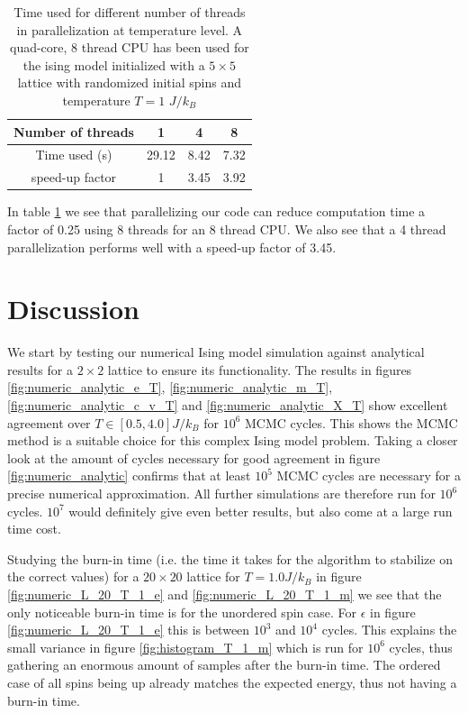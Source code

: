 \documentclass[english,notitlepage,reprint,nofootinbib]{revtex4-1}  %
\begin{document}
\begin{table}[H]
    \centering
    \caption{Time used for different number of threads in parallelization at temperature level. A quad-core, 8 thread CPU has been used for the ising model initialized with a $5\times5$ lattice with randomized initial spins and temperature $T= 1$ $J/k_B$}
    \label{tab:timing}
    \begin{tabular}{|c|c|c|c|}
        \hline
        Number of threads & 1     & 4    & 8    \\
        \hline
        Time used (s)     & 29.12 & 8.42 & 7.32 \\
        \hline
        speed-up factor   & 1     & 3.45 & 3.92 \\
        \hline
    \end{tabular}
\end{table}
In table \ref{tab:timing} we see that parallelizing our code can reduce computation time a factor of 0.25 using 8 threads for an 8 thread CPU. We also see that a 4 thread parallelization performs well with a speed-up factor of 3.45.
\section{Discussion}\label{sec:discussion}
We start by testing our numerical Ising model simulation against analytical results for a $2 \times 2$ lattice to ensure its functionality. The results in figures \ref{fig:numeric_analytic_e_T}, \ref{fig:numeric_analytic_m_T}, \ref{fig:numeric_analytic_c_v_T} and \ref{fig:numeric_analytic_X_T} show excellent agreement over $T \in [0.5, 4.0]J/k_B$ for $10^6$ MCMC cycles. This shows the MCMC method is a suitable choice for this complex Ising model problem. Taking a closer look at the amount of cycles necessary for good agreement in figure \ref{fig:numeric_analytic} confirms that at least $10^5$ MCMC cycles are necessary for a precise numerical approximation. All further simulations are therefore run for $10^6$ cycles. $10^7$ would definitely give even better results, but also come at a large run time cost.

Studying the burn-in time (i.e. the time it takes for the algorithm to stabilize on the correct values) for a $20 \times 20$ lattice for $T=1.0 J/k_B$ in figure \ref{fig:numeric_L_20_T_1_e} and \ref{fig:numeric_L_20_T_1_m} we see that the only noticeable burn-in time is for the unordered spin case. For $\epsilon$ in figure \ref{fig:numeric_L_20_T_1_e} this is between $10^3$ and $10^4$ cycles. This explains the small variance in figure \ref{fig:histogram_T_1_m} which is run for $10^6$ cycles, thus gathering an enormous amount of samples after the burn-in time. The ordered case of all spins being up already matches the expected energy, thus not having a burn-in time.
\end{document}
